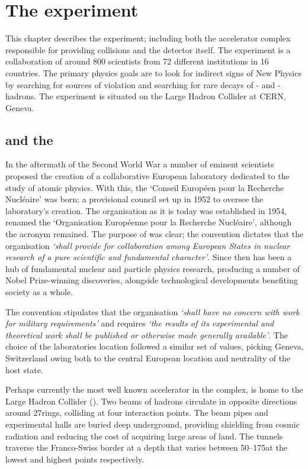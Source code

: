 \chapter{The \lhcb experiment} 
\label{ch:detector}
\minitoc


This chapter describes the \lhcb experiment; including both the accelerator complex responsible for providing \proton\proton collisions and the \lhcb detector itself.  
The \lhcb experiment is a collaboration of around 800 scientists from 72 different institutions in 16 countries. The primary physics goals are to look for indirect signs of New Physics by searching for sources of \CP violation and searching for rare decays of \bquark- and \cquark-hadrons. The experiment is situated on the Large Hadron Collider at CERN, Geneva. 



\section{\cern and the \lhc}


In the aftermath of the Second World War a number of eminent scientists proposed the creation of a collaborative European laboratory dedicated to the study of atomic physics. With this, the `Conseil Europ\'een pour la Recherche Nucl\'eaire' was born; a provisional council set up in 1952 to oversee the laboratory's creation.  The organisation as it is today was established in 1954, renamed the `Organisation Europ\'eenne pour la Recherche Nucl\'eaire', although the acronym \cern remained. 
The purpose of \cern was clear; the convention dictates that the organisation \emph{`shall provide for collaboration among European States in nuclear research of a pure scientific and fundamental character'}.
Since then \cern has been a hub of fundamental nuclear and particle physics research, producing a number of Nobel Prize-winning discoveries, alongside technological developments benefiting society as a whole.

The convention stipulates that the organisation \emph{`shall have no concern with work for military requirements'} and  
requires \emph{`the results of its experimental and theoretical work shall be published or otherwise made generally available'}. 
The choice of the laboratories location followed a similar set of values, picking Geneva, Switzerland owing both to the central European location and neutrality of the host state. 


Perhaps currently the most well known accelerator in the complex, \cern is home to the Large Hadron Collider (\lhc). Two beams of hadrons circulate in opposite directions around 27\km rings, colliding at four interaction points. The beam pipes and experimental halls are buried deep underground, providing shielding from cosmic radiation and reducing the cost of acquiring large areas of land. The tunnels traverse the Franco-Swiss border at a depth that varies between 50--175\m at the lowest and highest points respectively.      

